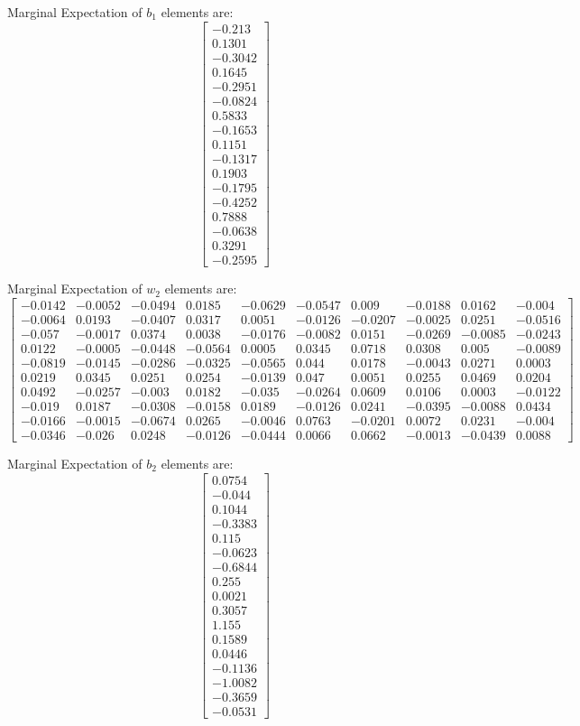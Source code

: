 \documentclass{article}
\begin{document}
Marginal Expectation of $b_1$ elements are:
\[
\begin{bmatrix}
-0.213\\
0.1301\\
-0.3042\\
0.1645\\
-0.2951\\
-0.0824\\
0.5833\\
-0.1653\\
0.1151\\
-0.1317\\
0.1903\\
-0.1795\\
-0.4252\\
0.7888\\
-0.0638\\
0.3291\\
-0.2595
\end{bmatrix}
\]

Marginal Expectation of $w_2$ elements are:
\[
\begin{bmatrix}
-0.0142&
-0.0052&
-0.0494&
0.0185&
-0.0629&
-0.0547&
0.009&
-0.0188&
0.0162&
-0.004\\
-0.0064&
0.0193&
-0.0407&
0.0317&
0.0051&
-0.0126&
-0.0207&
-0.0025&
0.0251&
-0.0516\\
-0.057&
-0.0017&
0.0374&
0.0038&
-0.0176&
-0.0082&
0.0151&
-0.0269&
-0.0085&
-0.0243\\
0.0122&
-0.0005&
-0.0448&
-0.0564&
0.0005&
0.0345&
0.0718&
0.0308&
0.005&
-0.0089\\
-0.0819&
-0.0145&
-0.0286&
-0.0325&
-0.0565&
0.044&
0.0178&
-0.0043&
0.0271&
0.0003\\
0.0219&
0.0345&
0.0251&
0.0254&
-0.0139&
0.047&
0.0051&
0.0255&
0.0469&
0.0204\\
0.0492&
-0.0257&
-0.003&
0.0182&
-0.035&
-0.0264&
0.0609&
0.0106&
0.0003&
-0.0122\\
-0.019&
0.0187&
-0.0308&
-0.0158&
0.0189&
-0.0126&
0.0241&
-0.0395&
-0.0088&
0.0434\\
-0.0166&
-0.0015&
-0.0674&
0.0265&
-0.0046&
0.0763&
-0.0201&
0.0072&
0.0231&
-0.004\\
-0.0346&
-0.026&
0.0248&
-0.0126&
-0.0444&
0.0066&
0.0662&
-0.0013&
-0.0439&
0.0088
\end{bmatrix}
\]

Marginal Expectation of $b_2$ elements are:
\[
\begin{bmatrix}
0.0754\\
-0.044\\
0.1044\\
-0.3383\\
0.115\\
-0.0623\\
-0.6844\\
0.255\\
0.0021\\
0.3057\\
1.155\\
0.1589\\
0.0446\\
-0.1136\\
-1.0082\\
-0.3659\\
-0.0531
\end{bmatrix}
\]
\end{document}
